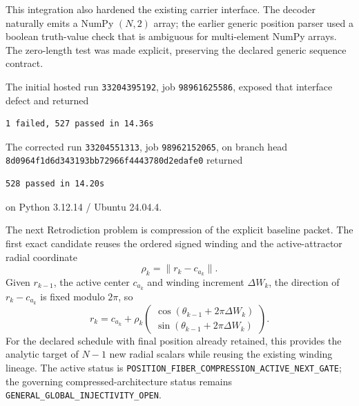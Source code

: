 This integration also hardened the existing carrier interface. The decoder naturally emits a NumPy $(N,2)$ array; the earlier generic position parser used a boolean truth-value check that is ambiguous for multi-element NumPy arrays. The zero-length test was made explicit, preserving the declared generic sequence contract.

The initial hosted run \texttt{33204395192}, job \texttt{98961625586}, exposed that interface defect and returned
\begin{verbatim}
1 failed, 527 passed in 14.36s
\end{verbatim}
The corrected run \texttt{33204551313}, job \texttt{98962152065}, on branch head \texttt{8d0964f1d6d343193bb72966f4443780d2edafe0} returned
\begin{verbatim}
528 passed in 14.20s
\end{verbatim}
on Python 3.12.14 / Ubuntu 24.04.4.

The next Retrodiction problem is compression of the explicit baseline packet. The first exact candidate reuses the ordered signed winding and the active-attractor radial coordinate
\[
\rho_k=\|r_k-c_{a_k}\|.
\]
Given $r_{k-1}$, the active center $c_{a_k}$ and winding increment $\Delta W_k$, the direction of $r_k-c_{a_k}$ is fixed modulo $2\pi$, so
\[
\boxed{
r_k=c_{a_k}+\rho_k
\begin{pmatrix}
\cos(\theta_{k-1}+2\pi\Delta W_k)\\
\sin(\theta_{k-1}+2\pi\Delta W_k)
\end{pmatrix}.
}
\]
For the declared schedule with final position already retained, this provides the analytic target of $N-1$ new radial scalars while reusing the existing winding lineage. The active status is \texttt{POSITION\_FIBER\_COMPRESSION\_ACTIVE\_NEXT\_GATE}; the governing compressed-architecture status remains \texttt{GENERAL\_GLOBAL\_INJECTIVITY\_OPEN}.
